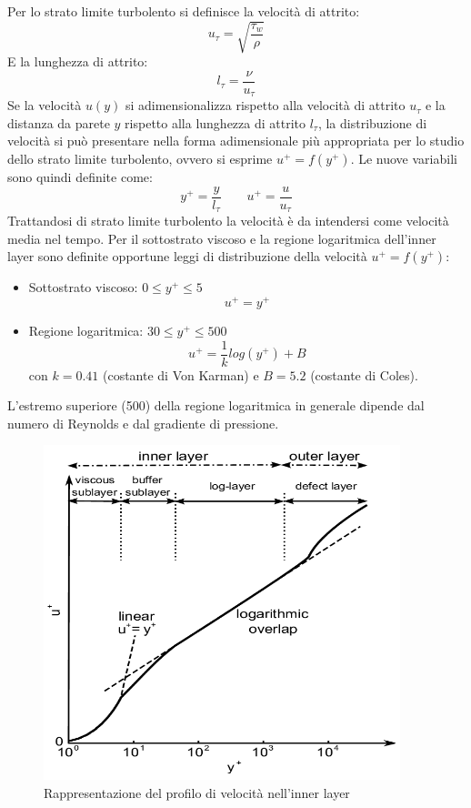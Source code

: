 \noindent Per lo strato limite turbolento si definisce la velocità di attrito:
\begin{equation*}
    u_\tau = \sqrt{\frac{\tau_w}{\rho}}
\end{equation*}
E la lunghezza di attrito:
\begin{equation*}
    l_\tau = \frac{\nu}{u_\tau}
\end{equation*}
Se la velocità $u(y)$ si adimensionalizza rispetto alla velocità di attrito $u_\tau$ e la distanza da parete $y$ rispetto alla lunghezza di attrito $l_\tau$, la distribuzione di velocità si può presentare nella forma adimensionale più appropriata per lo studio dello strato limite turbolento, ovvero si esprime $u^+ = f(y^+)$. Le nuove variabili sono quindi definite come:
\begin{equation*}
    y^+ = \frac{y}{l_\tau} \qquad u^+ = \frac{u}{u_\tau}
\end{equation*}
Trattandosi di strato limite turbolento la velocità è da intendersi come velocità media nel tempo. Per il sottostrato viscoso e la regione logaritmica dell'inner layer sono definite opportune leggi di distribuzione della velocità $u^+=f(y^+)$:
\begin{itemize}
    \item Sottostrato viscoso: $0 \le y^+ \le 5$
    \begin{equation*}
        u^+ = y^+
    \end{equation*}
    \item Regione logaritmica: $30 \le y^+ \le 500$
    \begin{equation*}
        u^+ = \frac{1}{k}log(y^+) + B
    \end{equation*}
    con $k = 0.41$ (costante di Von Karman) e $B = 5.2$ (costante di Coles).
\end{itemize}

\noindent L'estremo superiore (500) della regione logaritmica in generale dipende dal numero di Reynolds e dal gradiente di pressione.
\begin{figure}[H]
    \centering
    \includegraphics[width=.55\textwidth]{images/9/slinnerimage.png}
    \caption{Rappresentazione del profilo di velocità nell'inner layer}
\end{figure}

